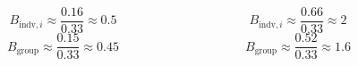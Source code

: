 \documentclass{beamer}
\begin{document}
\begin{frame}
    \begin{columns}
        \begin{column}{.5\textwidth}
            \begin{center}
                
                $$ B_{\text{indv}, i} \approx \frac{0.16}{0.33} \approx 0.5 $$
                $$B_{\text{group}} \approx  \frac{0.15}{0.33} \approx 0.45 $$
            \end{center}
        \end{column}
        \begin{column}{.5\textwidth}
            \begin{center}
                
                $$ B_{\text{indv}, i} \approx  \frac{0.66}{0.33} \approx 2 $$
                $$B_{\text{group}} \approx  \frac{0.52}{0.33} \approx 1.6 $$
            \end{center}
        \end{column}
    \end{columns}
\end{frame}
\end{document}
